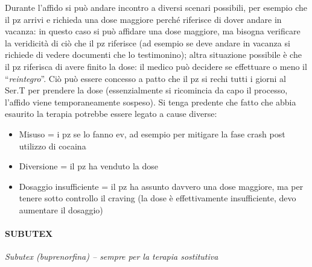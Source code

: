 Durante l'affido si può andare incontro a diversi scenari possibili, per
esempio che il pz arrivi e richieda una dose maggiore perché riferisce
di dover andare in vacanza: in questo caso si può affidare una dose
maggiore, ma bisogna verificare la veridicità di ciò che il pz riferisce
(ad esempio se deve andare in vacanza si richiede di vedere documenti
che lo testimonino); altra situazione possibile è che il pz riferisca di
avere finito la dose: il medico può decidere se effettuare o meno il
``\emph{reintegro}''. Ciò può essere concesso a patto che il pz si rechi
tutti i giorni al Ser.T per prendere la dose (essenzialmente si
ricomincia da capo il processo, l'affido viene temporaneamente sospeso).
Si tenga predente che fatto che abbia esaurito la terapia potrebbe
essere legato a cause diverse:

\begin{itemize}
\item
  Misuso = i pz se lo fanno ev, ad esempio per mitigare la fase crash
  post utilizzo di cocaina
\item
  Diversione = il pz ha venduto la dose
\item
  Dosaggio insufficiente = il pz ha assunto davvero una dose maggiore,
  ma per tenere sotto controllo il craving (la dose è effettivamente
  insufficiente, devo aumentare il dosaggio)
\end{itemize}

\paragraph{SUBUTEX}

\emph{Subutex (buprenorfina) -- sempre per la terapia sostitutiva}


